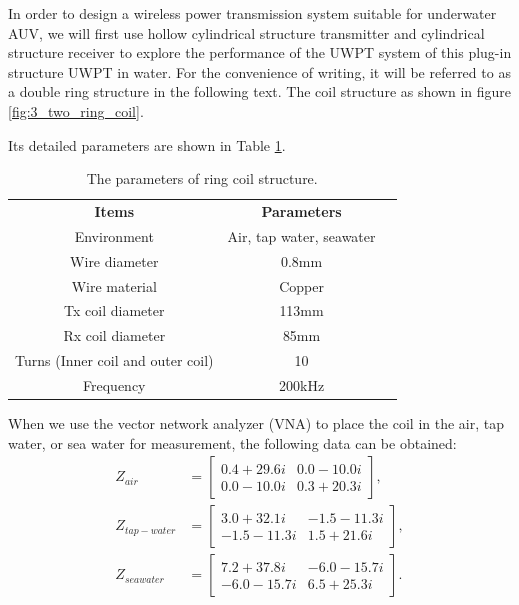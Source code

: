 In order to design a wireless power transmission system suitable for underwater AUV, we will first use hollow cylindrical structure transmitter and cylindrical structure receiver to explore the performance of the UWPT system of this plug-in structure UWPT in water. For the convenience of writing, it will be referred to as a double ring structure in the following text. The coil structure as shown in figure \ref{fig:3_two_ring_coil}.

Its detailed parameters are shown in Table \ref{table:ring coil parameters}.

\begin{table}[!t]
    \centering
    \caption{The parameters of ring coil structure.}
    \begin{tabular}{ c|cc }
        \thickhline
        \textbf{Items}                    & \textbf{Parameters}      \\
        \thickhline
        Environment                       & Air, tap water, seawater \\ \hline
        Wire diameter                     & 0.8mm                    \\ \hline
        Wire material                     & Copper                   \\
        \hline
        Tx coil diameter                  & 113mm                    \\ \hline
        Rx coil diameter                  & 85mm                     \\ \hline
        Turns (Inner coil and outer coil) & 10                       \\ \hline
        Frequency                         & 200kHz                   \\ \hline
    \end{tabular}
    \label{table:ring coil parameters}
\end{table}

When we use the vector network analyzer (VNA) to place the coil in the air, tap water, or sea water for measurement, the following data can be obtained:
\begin{equation*}
    \begin{aligned}
        Z_{air}       & =
        \begin{bmatrix}
            0.4 +29.6i & 0.0 -10.0i \\
            0.0 -10.0i & 0.3 +20.3i
        \end{bmatrix}, \\
        Z_{tap-water} & =
        \begin{bmatrix}
            3.0 +32.1i  & -1.5 -11.3i \\
            -1.5 -11.3i & 1.5 +21.6i
        \end{bmatrix}, \\
        Z_{seawater}  & =
        \begin{bmatrix}
            7.2 +37.8i  & -6.0 -15.7i \\
            -6.0 -15.7i & 6.5 +25.3i
        \end{bmatrix}.
    \end{aligned}
\end{equation*}

